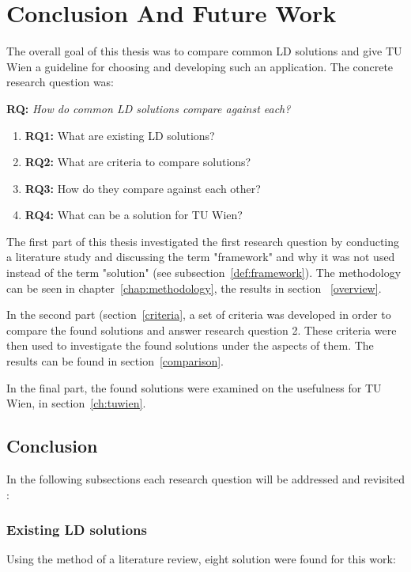 \chapter{Conclusion And Future Work}\label{ch:summary}

The overall goal of this thesis was to compare common LD solutions and give TU 
Wien a guideline for choosing and developing such an application. The concrete 
research question was: 

\textbf{RQ:} \textit{How do common LD solutions compare against each?}
\begin{enumerate}
\item \textbf{RQ1:} What are existing LD solutions?
\item \textbf{RQ2:} What are criteria to compare solutions?
\item \textbf{RQ3:} How do they compare against each other?
\item \textbf{RQ4:} What can be a solution for TU Wien?
\end{enumerate}

The first part of this thesis investigated the first research question by 
conducting a literature study and discussing the term "framework" and why it was 
not used instead of the term "solution" (see subsection~\ref{def:framework}). The 
methodology can be seen in chapter~\ref{chap:methodology}, the results in section~
\ref{overview}.

In the second part (section~\ref{criteria}, a set of criteria was developed in 
order to compare the found solutions and answer research question 2. These 
criteria were then used to investigate the found solutions under the aspects of 
them. The results can be found in section~\ref{comparison}.

In the final part, the found solutions were examined on the usefulness for TU 
Wien, in section~\ref{ch:tuwien}.  

\section{Conclusion}

In the following subsections each research question will be addressed and 
revisited :

\subsection{Existing LD solutions}

Using the method of a literature review, eight solution were found for this work: 


